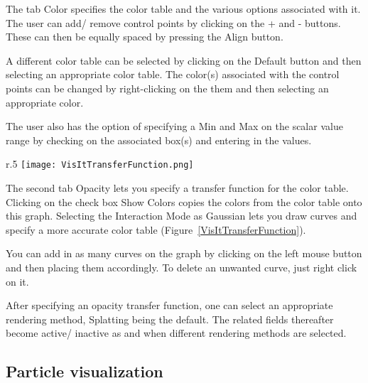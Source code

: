 The tab Color specifies the color table and the various options
associated with it. The user can add/ remove control points by
clicking on the + and - buttons. These can then be equally spaced by
pressing the Align button.

A different color table can be selected by clicking on the Default
button and then selecting an appropriate color table. The color(s)
associated with the control points can be changed by right-clicking on
the them and then selecting an appropriate color.

The user also has the option of specifying a Min and Max on the scalar
value range by checking on the associated box(s) and entering in the
values.

\begin{wrapfigure}{r}{.5\textwidth}
  \center
  \vspace{-20pt}
  \texttt{[image: VisItTransferFunction.png]}
  \caption{The opacity transfer function in the attributes window}
  \label{VisItTransferFunction}
\end{wrapfigure}

The second tab Opacity lets you specify a transfer function for the
color table. Clicking on the check box Show Colors copies the colors
from the color table onto this graph. Selecting the Interaction Mode
as Gaussian lets you draw curves and specify a more accurate color
table (Figure~\ref{VisItTransferFunction}).

You can add in as many curves on the graph by clicking on the left
mouse button and then placing them accordingly. To delete an unwanted
curve, just right click on it.

After specifying an opacity transfer function, one can select an
appropriate rendering method, Splatting being the default. The related
fields thereafter become active/ inactive as and when different
rendering methods are selected.

\subsection{Particle visualization}

